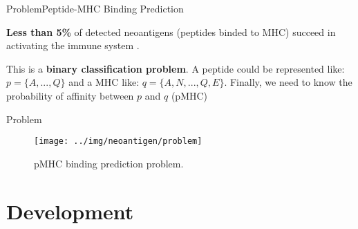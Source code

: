 \documentclass[10pt]{beamer}
\newcommand{\1}{
	\setbeamertemplate{background}{
		\texttt{[image: ../img/1]}
		\tikz[overlay] \fill[fill opacity=0.75,fill=white] (0,0) rectangle (-\paperwidth,\paperheight);
	}
}
\begin{document}
	\begin{frame}{Problem}{Peptide-MHC Binding Prediction}
		
		\begin{block}{}
			\textbf{Less than 5\%} of detected neoantigens (peptides binded to MHC) succeed in activating the immune system \cite{de2020neoantigen}.
		\end{block}
		
		
		\begin{block}{}
			This is a \textbf{binary classification problem}. A peptide could be represented like: $p = \{ A, ... , Q \}$ and a MHC like: $q = \{ A, N, ... ,Q, E \}$. Finally, we need to know the probability of affinity between $p$ and $q$ (pMHC)
		\end{block}
		
		
	\end{frame}
	
	\begin{frame}{Problem}{}	
		\begin{figure}
			\texttt{[image: ../img/neoantigen/problem]}
			\caption{pMHC binding prediction problem.}
		\end{figure}
	\end{frame}
	
	
	\section{Development}
	
\end{document}
